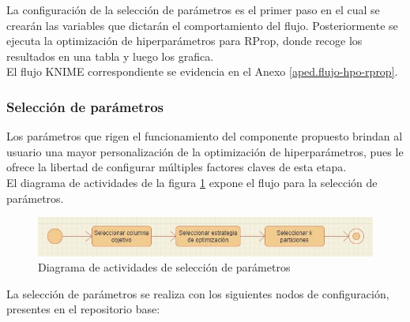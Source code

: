 La configuración de la selección de parámetros es el primer paso en el cual se crearán las variables que dictarán el comportamiento del flujo. Posteriormente se ejecuta la optimización de hiperparámetros para RProp, donde recoge los resultados en una tabla y luego los grafica.\\
El flujo KNIME correspondiente se evidencia en el Anexo \ref{aped.flujo-hpo-rprop}.

\subsubsection{Selección de parámetros}
Los parámetros que rigen el funcionamiento del componente propuesto brindan al usuario una mayor personalización de la optimización de hiperparámetros, pues le ofrece la libertad de configurar múltiples factores claves de esta etapa.\\
El diagrama de actividades de la figura \ref{fig:diagrama-act-selecc-param-hpo} expone el flujo para la selección de parámetros.

\begin{figure}[H]
	\centering
	\includegraphics[width=0.7\linewidth]{"figuras/capi 2/diagrama-act-selecc-param-hpo"}
	\caption[Diagrama de actividades de selección de parámetros]{Diagrama de actividades de selección de parámetros}
	\label{fig:diagrama-act-selecc-param-hpo}
\end{figure}

La selección de parámetros se realiza con los siguientes nodos de configuración, presentes en el repositorio base:

